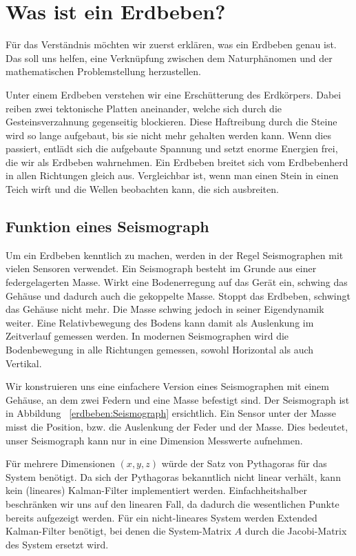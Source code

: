 %
%
\section{Was ist ein Erdbeben? \label{erdbeben:section:teil0}}
Für das Verständnis möchten wir zuerst erklären, was ein Erdbeben genau ist.
Das soll uns helfen, eine Verknüpfung zwischen dem Naturphänomen und der mathematischen Problemstellung herzustellen.

Unter einem Erdbeben verstehen wir eine Erschütterung des Erdkörpers.
Dabei reiben zwei tektonische Platten aneinander, welche sich durch die Gesteinsverzahnung gegenseitig blockieren.
Diese Haftreibung durch die Steine wird so lange aufgebaut, bis sie nicht mehr gehalten werden kann.
Wenn dies passiert, entlädt sich die aufgebaute Spannung und setzt enorme Energien frei, die wir als Erdbeben wahrnehmen.
Ein Erdbeben breitet sich vom Erdbebenherd in allen Richtungen gleich aus.
Vergleichbar ist, wenn man einen Stein in einen Teich wirft und die Wellen beobachten kann, die sich ausbreiten.

\subsection{Funktion eines Seismograph}
Um ein Erdbeben kenntlich zu machen, werden in der Regel Seismographen mit vielen Sensoren verwendet. 
Ein Seismograph besteht im Grunde aus einer federgelagerten Masse. Wirkt eine Bodenerregung auf das Gerät ein, schwing das Gehäuse und dadurch auch die gekoppelte Masse. 
Stoppt das Erdbeben, schwingt das Gehäuse nicht mehr. 
Die Masse schwing jedoch in seiner Eigendynamik weiter. 
Eine Relativbewegung des Bodens kann damit als Auslenkung im Zeitverlauf gemessen werden.
In modernen Seismographen wird die Bodenbewegung in alle Richtungen gemessen, sowohl Horizontal als auch Vertikal. 


Wir konstruieren uns eine einfachere Version eines Seismographen mit einem Gehäuse, an dem zwei Federn und eine Masse befestigt sind. 
Der Seismograph ist in Abbildung ~\ref{erdbeben:Seismograph} ersichtlich.
Ein Sensor unter der Masse misst die Position, bzw. die Auslenkung der Feder und der Masse.
Dies bedeutet, unser Seismograph kann nur in eine Dimension Messwerte aufnehmen. 

Für mehrere Dimensionen $(x,y,z)$ würde der Satz von Pythagoras für das System benötigt.
Da sich der Pythagoras bekanntlich nicht linear verhält, kann kein (lineares) Kalman-Filter implementiert werden. 
Einfachheitshalber beschränken wir uns auf den linearen Fall, da dadurch die wesentlichen Punkte bereits aufgezeigt werden. 
Für ein nicht-lineares System werden Extended Kalman-Filter benötigt, bei denen die System-Matrix $A$ durch die Jacobi-Matrix des System ersetzt wird.


